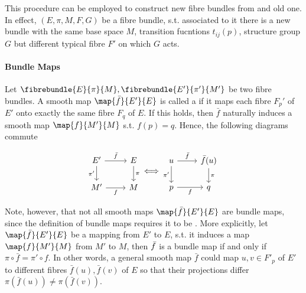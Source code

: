 This procedure can be employed to construct new fibre bundles from and old one. 
In effect, $(E, \pi, M, F, G)$ be a fibre bundle, s.t. associated to it there is a new bundle with the same base space $M$, transition fucntions $t_{ij}(p)$, structure group $G$ but different typical fibre $F'$ on which $G$ acts. \medbreak

\paragraph{Bundle Maps}

Let $\fibrebundle{E}{\pi}{M}, \fibrebundle{E'}{\pi'}{M'}$ be two fibre bundles. 
A smooth map $\map{\bar{f}}{E'}{E}$ is called a  if it maps each fibre $F_p'$ of $E'$ onto exactly the same fibre $F_q$ of $E$.
If this holds, then $\bar{f}$ naturally induces a smooth map $\map{f}{M'}{M}$ s.t. $f(p) = q$. 
Hence, the following diagrams commute

\[
\begin{tikzcd}
	{E'} & E \\
	{M'} & M
	\arrow["{\pi'}"', from=1-1, to=2-1]
	\arrow["f"', from=2-1, to=2-2]
	\arrow["\pi", from=1-2, to=2-2]
	\arrow["{\bar{f}}", from=1-1, to=1-2]
\end{tikzcd} \Longleftrightarrow 
\begin{tikzcd}
    {u} & {\bar{f}(u)} \\
    {p} & {q} 
    \arrow["{\pi'}"', from=1-1, to=2-1]
	\arrow["f"', from=2-1, to=2-2]
	\arrow["\pi", from=1-2, to=2-2]
	\arrow["{\bar{f}}", from=1-1, to=1-2]
\end{tikzcd}
\]

\begin{remark}
\end{remark}

Note, however, that not all smooth maps $\map{\bar{f}}{E'}{E}$ are bundle maps, since the definition of bundle maps requires it to be . 
More explicitly, let $\map{\bar{f}}{E'}{E}$ be a mapping from $E'$ to $E$, s.t. it induces a map $\map{{f}}{M'}{M}$ from $M'$ to $M$, then $\Bar{f}$ is a bundle map if and only if 
$\pi \circ \bar{f} = \pi' \circ f$. 
In other words, a general smooth map $\bar{f}$ could map $u,v \in F'_p$ of $E'$ to different fibres $\bar{f}(u), \bar{f}(v)$ of $E$ so that their projections differ $\pi (\bar{f}(u)) \neq \pi(\bar{f}(v))$. \medbreak

\paragraph{}

